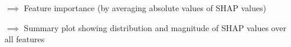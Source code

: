 \begin{enumerate}
    \begin{itemize}
        \item[$\implies$] Feature importance (by averaging absolute values of SHAP values)
        \item[$\implies$] Summary plot showing distribution and magnitude of SHAP values over all features
    \end{itemize}
\end{enumerate}
